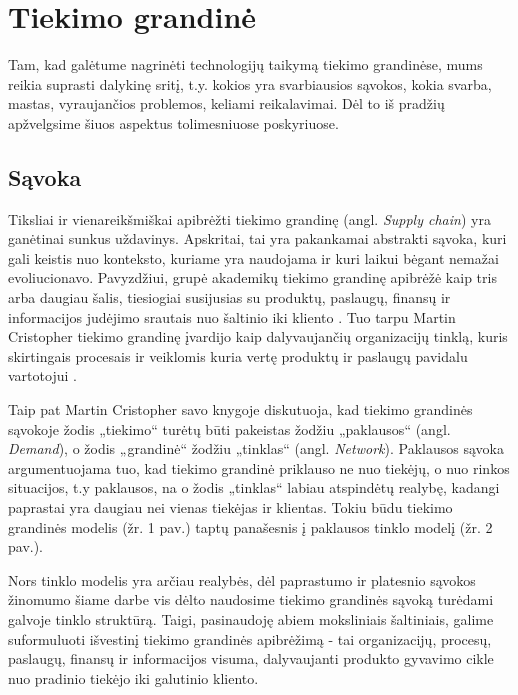 \section {Tiekimo grandinė}

Tam, kad galėtume nagrinėti technologijų taikymą tiekimo grandinėse, mums reikia suprasti dalykinę sritį, t.y. kokios yra svarbiausios sąvokos, kokia svarba, mastas, vyraujančios problemos, keliami reikalavimai. Dėl to iš pradžių apžvelgsime šiuos aspektus tolimesniuose poskyriuose.

\subsection{Sąvoka}

Tiksliai ir vienareikšmiškai apibrėžti tiekimo grandinę (angl. \textit{Supply chain}) yra ganėtinai sunkus uždavinys. Apskritai, tai yra pakankamai abstrakti sąvoka, kuri gali keistis nuo konteksto, kuriame yra naudojama ir kuri laikui bėgant nemažai evoliucionavo. Pavyzdžiui, grupė akademikų tiekimo grandinę apibrėžė kaip tris arba daugiau šalis, tiesiogiai susijusias su produktų, paslaugų, finansų ir informacijos judėjimo srautais nuo šaltinio iki kliento \cite{mentzer2001defining}. Tuo tarpu Martin Cristopher tiekimo grandinę įvardijo kaip dalyvaujančių organizacijų tinklą, kuris skirtingais procesais ir veiklomis kuria vertę produktų ir paslaugų pavidalu vartotojui \cite{christopher2016logistics}. 

Taip pat Martin Cristopher savo knygoje diskutuoja, kad tiekimo grandinės sąvokoje žodis „tiekimo“ turėtų būti pakeistas žodžiu „paklausos“ (angl. \textit{Demand}), o žodis „grandinė“ žodžiu „tinklas“ (angl. \textit{Network}). Paklausos sąvoka argumentuojama tuo, kad tiekimo grandinė priklauso ne nuo tiekėjų, o nuo rinkos situacijos, t.y paklausos, na o žodis „tinklas“ labiau atspindėtų realybę, kadangi paprastai yra daugiau nei vienas tiekėjas ir klientas. Tokiu būdu tiekimo grandinės modelis (žr. 1 pav.) taptų panašesnis į paklausos tinklo modelį (žr. 2 pav.).

Nors tinklo modelis yra arčiau realybės, dėl paprastumo ir platesnio sąvokos žinomumo šiame darbe vis dėlto naudosime tiekimo grandinės sąvoką turėdami galvoje tinklo struktūrą. Taigi, pasinaudoję abiem moksliniais šaltiniais, galime suformuluoti išvestinį tiekimo grandinės apibrėžimą - tai organizacijų, procesų, paslaugų, finansų ir informacijos visuma, dalyvaujanti produkto gyvavimo cikle nuo pradinio tiekėjo iki galutinio kliento.

